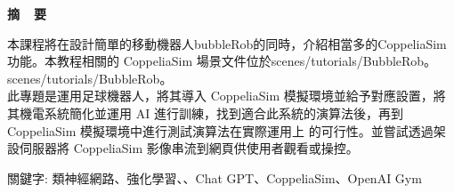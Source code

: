 \renewcommand{\baselinestretch}{1.5} %
\clearpage  %
\sectionef
{} %
\begin{center}
\LARGE\textbf{摘~~要}\\
\end{center}
\begin{flushleft}
\fontsize{14pt}{20pt}\sectionef\hspace{12pt}\quad 本課程將在設計簡單的移動機器人bubbleRob的同時，介紹相當多的CoppeliaSim功能。本教程相關的 CoppeliaSim 場景文件位於scenes/tutorials/BubbleRob。scenes/tutorials/BubbleRob。\\[12pt]

\fontsize{14pt}{20pt}\sectionef\hspace{12pt}\quad 此專題是運用足球機器人，將其導入 CoppeliaSim 模擬環境並給予對應設置，將其機電系統簡化並運用 AI 進行訓練，找到適合此系統的演算法後，再到 CoppeliaSim 模擬環境中進行測試演算法在實際運用上
的可行性。並嘗試透過架設伺服器將 CoppeliaSim 影像串流到網頁供使用者觀看或操控。
\\[12pt]

\end{flushleft}
\begin{center}
\fontsize{14pt}{20pt}\selectfont 關鍵字: 類神經網路、強化學習、\sectionef 、Chat GPT、CoppeliaSim、OpenAI Gym
\end{center}
\newpage
\renewcommand{\baselinestretch}{1.5} %
